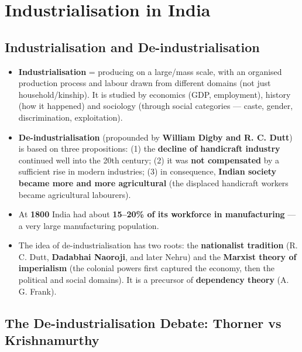 \chapter{Industrialisation in India}

\section{Industrialisation and De-industrialisation}

\begin{KeyConcept}
\begin{itemize}
\item \textbf{Industrialisation} = producing on a large/mass scale, with an organised production process and labour drawn from different domains (not just household/kinship). It is studied by economics (GDP, employment), history (how it happened) and sociology (through social categories --- caste, gender, discrimination, exploitation).
\item \textbf{De-industrialisation} (propounded by \textbf{William Digby and R. C. Dutt}) is based on three propositions: (1) the \textbf{decline of handicraft industry} continued well into the 20th century; (2) it was \textbf{not compensated} by a sufficient rise in modern industries; (3) in consequence, \textbf{Indian society became more and more agricultural} (the displaced handicraft workers became agricultural labourers).
\item At \textbf{1800} India had about \textbf{15--20\% of its workforce in manufacturing} --- a very large manufacturing population.
\item The idea of de-industrialisation has two roots: the \textbf{nationalist tradition} (R. C. Dutt, \textbf{Dadabhai Naoroji}, and later Nehru) and the \textbf{Marxist theory of imperialism} (the colonial powers first captured the economy, then the political and social domains). It is a precursor of \textbf{dependency theory} (A. G. Frank).
\end{itemize}
\end{KeyConcept}

\section{The De-industrialisation Debate: Thorner vs Krishnamurthy}

